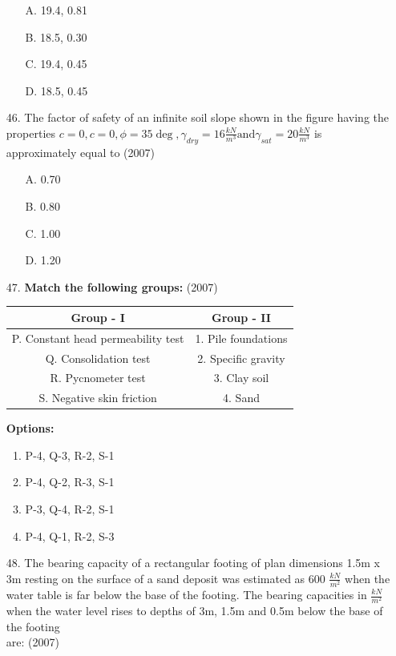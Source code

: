 \documentclass[journal]{IEEEtran}
\begin{document}
\begin{enumerate}
\begin{enumerate}
    \item [A.] 19.4, 0.81
    \item [B.] 18.5, 0.30
    \item [C.] 19.4, 0.45
    \item [D.] 18.5, 0.45
  \end{enumerate}
  \item [46.] The factor of safety of an infinite soil slope shown in the figure having the
  properties $c=0, c=0,\phi=35\deg,\gamma_{dry}=16\frac{kN}{m^3} \text{and} \gamma_{sat}=20\frac{kN}{m^3}$ is
  approximately equal to \hfill (2007)
  \begin{figure}[!ht]
    \centering
    \caption{ }
    \label{fig:6}
  \end{figure}
  \begin{enumerate}
    \item [A.] 0.70
    \item [B.] 0.80
    \item [C.] 1.00
    \item [D.] 1.20
  \end{enumerate} 
  
  \item [47.] \textbf{Match the following groups:} \hfill (2007)

  \begin{center}
  \begin{tabular}{|c c|}
  \hline
  \textbf{Group - I} & \textbf{Group - II} \\
  \hline
  P. Constant head permeability test & 1. Pile foundations \\
  Q. Consolidation test               & 2. Specific gravity \\
  R. Pycnometer test                  & 3. Clay soil \\
  S. Negative skin friction            & 4. Sand \\
  \hline
  \end{tabular}
  \end{center}
  
  \textbf{Options:}
  
  \begin{enumerate}[label=\Alph*]
      \item P-4, Q-3, R-2, S-1
      \item P-4, Q-2, R-3, S-1
      \item P-3, Q-4, R-2, S-1
      \item P-4, Q-1, R-2, S-3
  \end{enumerate}
  \item [48.] The bearing capacity of a rectangular footing of plan dimensions 1.5m x 3m resting on the surface of a sand deposit was estimated as 600 $\frac{kN}{m^2}$ when the water table is far below the base of the footing. The bearing capacities in $\frac{kN}{m^2}$ when the water level rises to depths of 3m, 1.5m and 0.5m below the base of the footing\\ are: \hfill (2007)


\end{enumerate}
\end{document}
